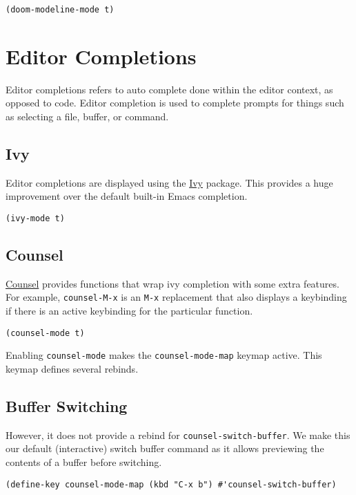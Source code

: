 \documentclass[11pt]{article}
\begin{document}
\begin{verbatim}
(doom-modeline-mode t)
\end{verbatim}
\section{Editor Completions}
\label{sec:org20d201f}

Editor completions refers to auto complete done within the editor context, as
opposed to code. Editor completion is used to complete prompts for things such
as selecting a file, buffer, or command.
\subsection{Ivy}
\label{sec:org31f9639}

Editor completions are displayed using the \href{https://github.com/abo-abo/swiper?tab=readme-ov-file\#ivy}{Ivy} package. This provides a huge
improvement over the default built-in Emacs completion.

\begin{verbatim}
(ivy-mode t)
\end{verbatim}
\subsection{Counsel}
\label{sec:orgccc2d77}

\href{https://github.com/abo-abo/swiper?tab=readme-ov-file\#counsel}{Counsel} provides functions that wrap ivy completion with some extra
features. For example, \texttt{counsel-M-x} is an \texttt{M-x} replacement that also displays
a keybinding if there is an active keybinding for the particular function.

\begin{verbatim}
(counsel-mode t)
\end{verbatim}

Enabling \texttt{counsel-mode} makes the \texttt{counsel-mode-map} keymap active. This keymap
defines several rebinds.
\subsection{Buffer Switching}
\label{sec:org840e82b}

However, it does not provide a rebind for \texttt{counsel-switch-buffer}. We make this
our default (interactive) switch buffer command as it allows previewing the
contents of a buffer before switching.

\begin{verbatim}
(define-key counsel-mode-map (kbd "C-x b") #'counsel-switch-buffer)
\end{verbatim}
\end{document}

